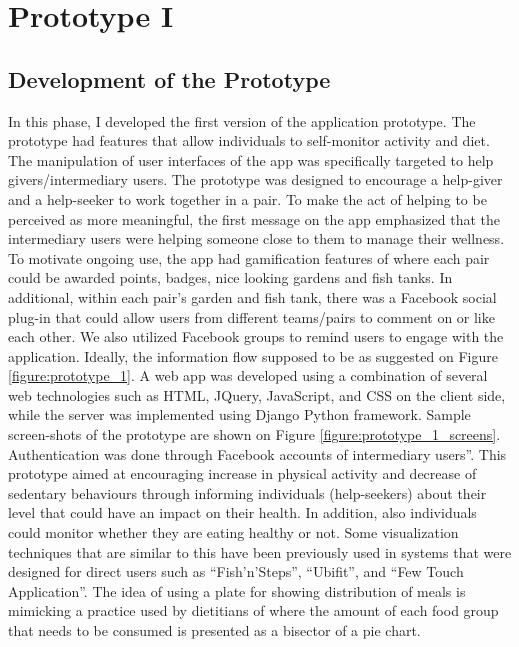 
\chapter{Prototype I} %

\label{prototype1chapter} %

\section{Development of the Prototype}
In this phase, I developed the first version of the application prototype. The prototype had features that allow individuals to self-monitor activity and diet.  The manipulation of user interfaces of the app was specifically targeted to help givers/intermediary users. The prototype was designed to encourage a help-giver and a help-seeker to work together in a pair. To make the act of helping to be perceived as more meaningful, the first message on the app emphasized that the intermediary users were helping someone close to them to manage their wellness.  To motivate ongoing use, the app had gamification features of where each pair could be awarded points, badges, nice looking gardens and fish tanks. In additional, within each pair's garden and fish tank, there was a Facebook social plug-in that could allow users from different teams/pairs to comment on or like each other. We also utilized Facebook groups to remind users to engage with the application. Ideally, the information flow supposed to be as suggested on Figure \ref{figure:prototype_1}. A web app was developed using a combination of several web technologies such as HTML, JQuery, JavaScript, and CSS on the client side, while the server was implemented using Django Python framework. Sample screen-shots of the prototype are shown on Figure \ref{figure:prototype_1_screens}. Authentication was done through Facebook accounts of intermediary users''. This prototype aimed at encouraging increase in physical activity and  decrease of sedentary behaviours through informing individuals (help-seekers) about their level that could have an impact on their health. In addition, also individuals could monitor whether they are eating healthy or not. Some visualization techniques that are similar to this have been previously used  in systems that were designed for direct users such as ``Fish'n'Steps''\citep{lin2006:fish}, ``Ubifit''\citep{klasnja2009:using},  and ``Few Touch Application''\citep{arsand:mobile}. The idea of using a plate for showing distribution of meals is mimicking a practice used by dietitians of where the amount of each food group that needs to be consumed is presented as a bisector of a pie chart. 
   
